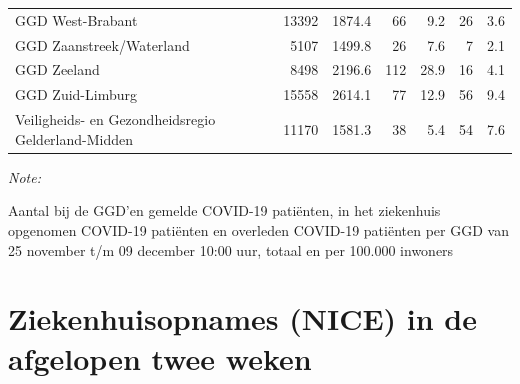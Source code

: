 \documentclass[
  english,
  man,floatsintext]{apa6}
\begin{document}
\begin{table}
\begin{threeparttable}
\begin{tabular}{lrrrrrr}
GGD West-Brabant & 13392 & 1874.4 & 66 & 9.2 & 26 & 3.6\\
GGD Zaanstreek/Waterland & 5107 & 1499.8 & 26 & 7.6 & 7 & 2.1\\
GGD Zeeland & 8498 & 2196.6 & 112 & 28.9 & 16 & 4.1\\
GGD Zuid-Limburg & 15558 & 2614.1 & 77 & 12.9 & 56 & 9.4\\
Veiligheids- en Gezondheidsregio Gelderland-Midden & 11170 & 1581.3 & 38 & 5.4 & 54 & 7.6\\
\bottomrule
\end{tabular}
\begin{tablenotes}
\item \textit{Note: } 
\item Aantal bij de GGD’en gemelde COVID-19 patiënten, in het ziekenhuis opgenomen COVID-19 patiënten en overleden COVID-19 patiënten per GGD van 25 november t/m 09 december 10:00 uur, totaal en per 100.000 inwoners
\end{tablenotes}
\end{threeparttable}
\endgroup{}
\end{table}

\newpage

\hypertarget{ziekenhuisopnames-nice-in-de-afgelopen-twee-weken}{%
\section{Ziekenhuisopnames (NICE) in de afgelopen twee weken}\label{ziekenhuisopnames-nice-in-de-afgelopen-twee-weken}}
\end{document}
